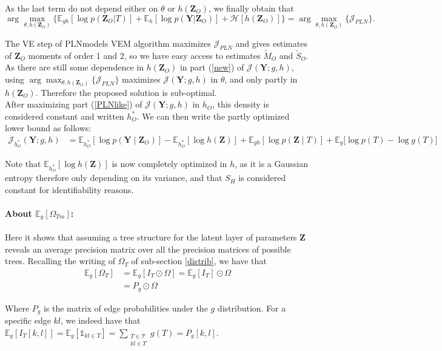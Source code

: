 \documentclass[11pt,a4paper]{article}
\newcommand{\argmax}{\arg\!\max}
\newcommand{\entr}{\mathcal{H}}
\newcommand{\Ybf}{\boldsymbol{Y}}
\newcommand{\Zbf}{\boldsymbol{Z}}
\newcommand{\Esp}{\mathds{E}}
\begin{document}
As the last term do not depend either on $\theta$ or $h(\Zbf_O)$, we finally obtain that
 $$ \argmax_{\theta, h(\Zbf_O)} \big\{\Esp_{gh}[\log p(\Zbf_O | T)] +\Esp_h[\log p(\Ybf|\Zbf_O)]+ \entr[h(\Zbf_O)]\big\} = \argmax_{\theta, h(\Zbf_O)} \big\{ \mathcal{J}_{PLN} \big\}.$$

The VE step of PLNmodels VEM algorithm maximizes $\mathcal{J}_{PLN}$ and gives estimates of $\Zbf_O$ moments of order 1 and 2, so we have easy access to estimates $\widetilde{M}_O$ and $\widetilde{S}_O$. As there are still some dependence in $h(\Zbf_O)$ in part (\ref{new}) of $\mathcal{J}(\Ybf; g,h)$, using $\argmax_{\theta, h(\Zbf_O)} \big\{ \mathcal{J}_{PLN} \big\}$ maximizes  $\mathcal{J}(\Ybf;g,h)$ in $\theta$, and only partly in $h(\Zbf_O)$. Therefore   the proposed solution is sub-optimal. \\

After maximizing part (\ref{PLNlike}) of $\mathcal{J}(\Ybf; g,h)$ in $h_O$, this density is considered constant and written $h_O^*$.  We can then write the partly optimized  lower bound as follows:
\begin{align*}
\mathcal{J}_{h_O^*}(\Ybf; g,h)&= \Esp_{h_O^*}[\log p(\Ybf \mid \Zbf_O)] - \Esp_{h_O^*}[\log h(\Zbf)] + \Esp_{gh}[\log p(\Zbf \mid T)] + \Esp_g \big[\log p(T) - \log g(T) \big]
\end{align*}

 Note that $\Esp_{h_O^*}[\log h(\Zbf)]$ is now completely optimized in $h$, as it is a Gaussian entropy therefore only depending on its variance, and that $S_H$ is considered constant for identifiability reasons.

\paragraph{About $\Esp_g [\Omega_{Tm}]$:}
Here it shows that assuming a tree structure for the latent layer of parameters $\Zbf$ reveals an average precision matrix over all the precision matrices of possible trees.  Recalling the writing of $\Omega_T$ of sub-section \ref{distrib}, we have that
 \begin{align*}
 \Esp_g [\Omega_{T}] & = \Esp_g [I_T \odot \Omega ] = \Esp_g [I_T] \odot \Omega \\
 &= P_g\odot \Omega
 \end{align*}

Where $P_g$ is the matrix of edge probabilities under the $g$ distribution. For a specific edge $kl$, we indeed have that $\Esp_g [I_T[k,l]] = \Esp_g [\mathds{1}_{kl \in T}] =  \sum_{\substack{T\in \mathcal{T}\\ kl \in T } }g(T) = P_g[k,l]$.
\end{document}
